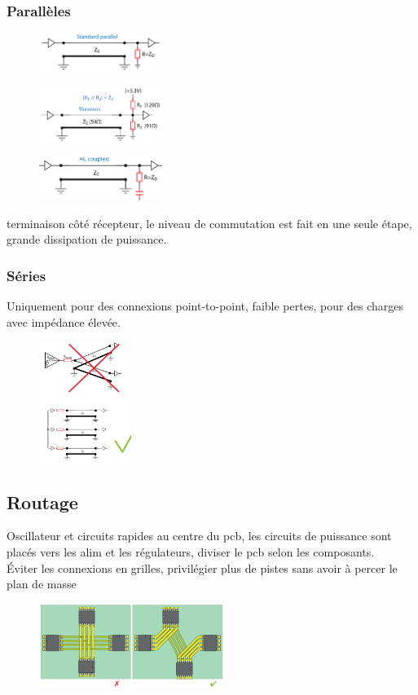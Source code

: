 \documentclass[resume]{subfiles}
\begin{document}
\begin{multicols}{3}
\subsubsection{Parallèles}
\begin{figure}[H]
\centering
\includegraphics[width=4.00cm]{img_22.png}
\end{figure}
\begin{figure}[H]
\centering
\includegraphics[width=4.00cm]{img_23.png}
\end{figure}
\begin{figure}[H]
\centering
\includegraphics[width=4.00cm]{img_24.png}
\end{figure}
terminaison côté récepteur, le niveau de commutation est fait en une seule étape, grande dissipation de puissance.
\subsubsection{Séries}
Uniquement pour des connexions point-to-point, faible pertes, pour des charges avec impédance élevée.
\begin{figure}[H]
\centering
\includegraphics[width=3.00cm]{img_25.png}
\end{figure}
\subsection{Routage}
Oscillateur et circuits rapides au centre du pcb, les circuits de puissance sont placés vers les alim et les régulateurs, diviser le pcb selon les composants.\\
Éviter les connexions en grilles, privilégier plus de pistes sans avoir à percer le plan de masse
\begin{figure}[H]
\centering
\includegraphics[width=6.00cm]{img_28.png}
\end{figure}

\end{multicols}
\end{document}
